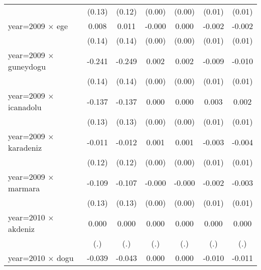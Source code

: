 {\begin{tabular}{l*{6}{c}}
                    &      (0.13)         &      (0.12)         &      (0.00)         &      (0.00)         &      (0.01)         &      (0.01)         \\
year=2009 $\times$ ege&       0.008         &       0.011         &      -0.000         &       0.000         &      -0.002         &      -0.002         \\
                    &      (0.14)         &      (0.14)         &      (0.00)         &      (0.00)         &      (0.01)         &      (0.01)         \\
year=2009 $\times$ guneydogu&      -0.241         &      -0.249         &       0.002         &       0.002         &      -0.009         &      -0.010         \\
                    &      (0.14)         &      (0.14)         &      (0.00)         &      (0.00)         &      (0.01)         &      (0.01)         \\
year=2009 $\times$ icanadolu&      -0.137         &      -0.137         &       0.000         &       0.000         &       0.003         &       0.002         \\
                    &      (0.13)         &      (0.13)         &      (0.00)         &      (0.00)         &      (0.01)         &      (0.01)         \\
year=2009 $\times$ karadeniz&      -0.011         &      -0.012         &       0.001         &       0.001         &      -0.003         &      -0.004         \\
                    &      (0.12)         &      (0.12)         &      (0.00)         &      (0.00)         &      (0.01)         &      (0.01)         \\
year=2009 $\times$ marmara&      -0.109         &      -0.107         &      -0.000         &      -0.000         &      -0.002         &      -0.003         \\
                    &      (0.13)         &      (0.13)         &      (0.00)         &      (0.00)         &      (0.01)         &      (0.01)         \\
year=2010 $\times$ akdeniz&       0.000         &       0.000         &       0.000         &       0.000         &       0.000         &       0.000         \\
                    &         (.)         &         (.)         &         (.)         &         (.)         &         (.)         &         (.)         \\
year=2010 $\times$ dogu&      -0.039         &      -0.043         &       0.000         &       0.000         &      -0.010         &      -0.011         \\

\end{tabular}}
